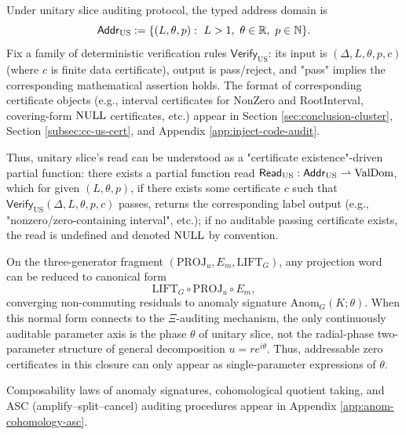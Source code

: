 \begin{definition}\label{def:us-typed-address-null}
Under unitary slice auditing protocol, the typed address domain is
$$
\Addr_{\mathrm{US}}:=\{(L,\theta,p):\ L>1,\ \theta\in\RR,\ p\in\NN\}.
$$
Fix a family of deterministic verification rules $\mathsf{Verify}_{\mathrm{US}}$: its input is $(\Delta,L,\theta,p,c)$ (where $c$ is finite data certificate), output is pass/reject, and "pass" implies the corresponding mathematical assertion holds. The format of corresponding certificate objects (e.g., interval certificates for NonZero and RootInterval, covering-form $\mathrm{NULL}$ certificates, etc.) appear in Section \ref{sec:conclusion-cluster}, Section \ref{subsec:cc-us-cert}, and Appendix \ref{app:inject-code-audit}.\par
Thus, unitary slice's read can be understood as a "certificate existence"-driven partial function: there exists a partial function read $\mathsf{Read}_{\mathrm{US}}:\mathsf{Addr}_{\mathrm{US}}\rightharpoonup \mathrm{ValDom}$, which for given $(L,\theta,p)$, if there exists some certificate $c$ such that $\mathsf{Verify}_{\mathrm{US}}(\Delta,L,\theta,p,c)$ passes, returns the corresponding label output (e.g., "nonzero/zero-containing interval", etc.); if no auditable passing certificate exists, the read is undefined and denoted $\mathrm{NULL}$ by convention.\par
\end{definition}

On the three-generator fragment $(\mathrm{PROJ}_u,E_m,\mathrm{LIFT}_G)$, any projection word can be reduced to canonical form
$$
\mathrm{LIFT}_G\circ \mathrm{PROJ}_u\circ E_m,
$$
converging non-commuting residuals to anomaly signature $\mathrm{Anom}_G(K;\theta)$. When this normal form connects to the $\Xi$-auditing mechanism, the only continuously auditable parameter axis is the phase $\theta$ of unitary slice, not the radial-phase two-parameter structure of general decomposition $u=re^{i\theta}$. Thus, addressable zero certificates in this closure can only appear as single-parameter expressions of $\theta$.\par

Composability laws of anomaly signatures, cohomological quotient taking, and ASC (amplify--split--cancel) auditing procedures appear in Appendix \ref{app:anom-cohomology-asc}.\par
